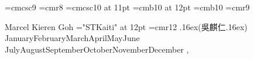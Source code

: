 
\def\today{\ifcase\month\or
  January\or February\or March\or April\or May\or June\or
  July\or August\or September\or October\or November\or December\fi
  \space\number\day, \number\year}
\newcount\twodigits
\def\hours{\twodigits=\time \divide\twodigits by 60 \printtwodigits
  \multiply\twodigits by-60 \advance\twodigits by\time :\printtwodigits}
\def\gobbleone1{}
\def\printtwodigits{\advance\twodigits100
  \expandafter\gobbleone\number\twodigits
  \advance\twodigits-100 }

\font\ninesc=cmcsc9
\font\eightrm=cmr8
\font\elevensc=cmcsc10 at 11pt  %
\font\bigbold=cmb10 at 12pt  %
\font\tenb=cmb10
\font\mc=cmr9

\let\tenbf=\tenb

\newdimen\itemindent
\newif\ifitempar \itempartrue
\def\itemindentset#1{\setbox0\hbox{{\bf #1.\kern.25em}}\itemindent=\wd0\relax}
\def\pubbegin #1{\itemindentset{#11}} %
\def\ppubbegin #1{\itemindentset{#111}} %
\def\pubitem#1.{\ifitempar\smallskip\noindent\else\itempartrue
  \hskip-\parindent\fi
  \hbox to\itemindent{\bf\hfil #1.\kern.25em}%
  \hangindent=\itemindent\hangafter=1\ignorespaces}

\def\up#1{\leavevmode \raise.16ex\hbox{#1}}
\def\sectheader#1{{\bigskip\elevensc #1}\smallskip\hrule\medskip}
\def\leftright#1#2{{#1}\hfill{#2}\par}
\def\CEE{{\mc C}}
\def\UNIX{{\mc UNIX}}
\def\thing{\item{$\bullet$}}

\parindent=0pt  %

\newcount\papercount
{}
\def\papitem{\pubitem P\the\papercount. \global\advance\papercount by 1}
\newcount\submittedcount
{}
\def\subitem{\pubitem S\the\submittedcount. \global\advance\submittedcount by 1}
\newcount\reportcount
{}
\def\repitem{\pubitem R\the\reportcount. \global\advance\reportcount by 1}

\def\datethis{\eightrm \today}



\leftright{\bigbold Marcel Kieren Goh
\ifx\Umathchar\undefined\else%
\font\chinese="STKaiti" at 12pt%
\font\twelverm=cmr12%
\twelverm\up({\chinese 吳麒仁}\up)%
\fi}{\datethis}
\smallskip

